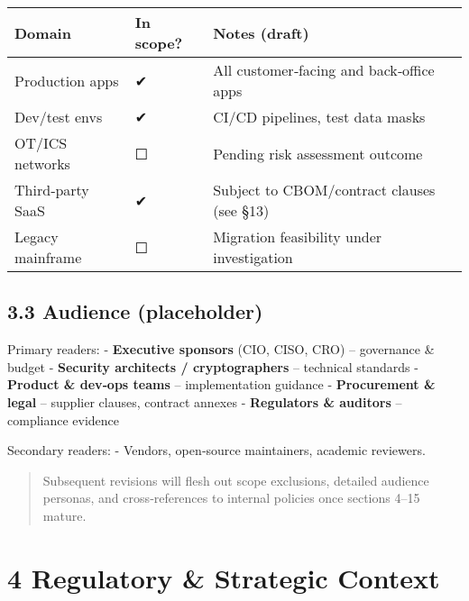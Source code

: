 \documentclass[
  english,
]{article}
\begin{document}
\begin{longtable}[]{@{}
  >{\raggedright\arraybackslash}p{}
  >{\raggedright\arraybackslash}p{}
  >{\raggedright\arraybackslash}p{}@{}}
\toprule\noalign{}
\begin{minipage}[b]{\linewidth}\raggedright
Domain
\end{minipage} & \begin{minipage}[b]{\linewidth}\raggedright
In scope?
\end{minipage} & \begin{minipage}[b]{\linewidth}\raggedright
Notes (draft)
\end{minipage} \\
\midrule\noalign{}
\endhead
\bottomrule\noalign{}
\endlastfoot
Production apps & ✔ & All customer‑facing and back‑office apps \\
Dev/test envs & ✔ & CI/CD pipelines, test data masks \\
OT/ICS networks & ☐ & Pending risk assessment outcome \\
Third‑party SaaS & ✔ & Subject to CBOM/contract clauses (see §13) \\
Legacy mainframe & ☐ & Migration feasibility under investigation \\
\end{longtable}

\subsection{3.3 Audience (placeholder)}\label{audience-placeholder}

Primary readers: - \textbf{Executive sponsors} (CIO, CISO, CRO) --
governance \& budget - \textbf{Security architects / cryptographers} --
technical standards - \textbf{Product \& dev‑ops teams} --
implementation guidance - \textbf{Procurement \& legal} -- supplier
clauses, contract annexes - \textbf{Regulators \& auditors} --
compliance evidence

Secondary readers: - Vendors, open‑source maintainers, academic
reviewers.

\begin{quote}
Subsequent revisions will flesh out scope exclusions, detailed audience
personas, and cross‑references to internal policies once sections 4--15
mature.
\end{quote}

\section{4 Regulatory \& Strategic
Context}\label{regulatory-strategic-context}
\end{document}
